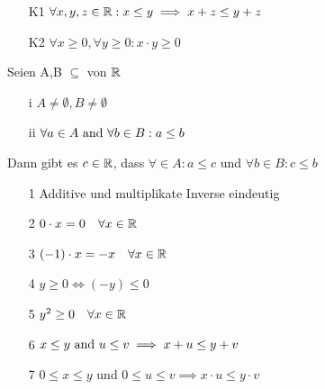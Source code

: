 \Def[Kompatibilität]
\begin{enumerate}
    \item[K1] \(\forall x,y,z \in \mathbb{R}: x \leq y \implies x + z \leq y + z \)
    \item[K2] \(\forall x \geq 0, \forall y \geq 0: x \cdot y \geq 0\)
\end{enumerate}
\Def[Ordnungsvollständigkeit] Seien A,B \(\subseteq\) von \(\mathbb{R}\)
\begin{enumerate}
    \item [i] \(A \neq \emptyset, B \neq \emptyset\)
    \item [ii] \(\forall a \in A$ and $\forall b \in B: a \leq b\)
\end{enumerate}
Dann gibt es \(c \in \mathbb{R}\), dass \(\forall \in A : a \leq c\) und \(\forall b \in B: c \leq b\) \newline
\Korollar[1.6]
\begin{enumerate}
    \item [1] Additive und multiplikate Inverse eindeutig
    \item [2] \(0 \cdot x = 0 \quad \forall x \in \mathbb{R} \)
    \item [3] \((-1) \cdot x = -x \quad \forall x \in \mathbb{R} \)
    \item [4] \(y \geq 0 \Leftrightarrow (-y) \leq 0\)
    \item [5] \(y^2 \geq 0 \quad \forall x \in \mathbb{R} \)
    \item [6] \(x \leq y $ and $u \leq v \implies x+ u \leq y + v\)
    \item [7] \(0 \leq x \leq y\) und \(0 \leq u \leq v \implies x \cdot u \leq y \cdot v\)
\end{enumerate}

